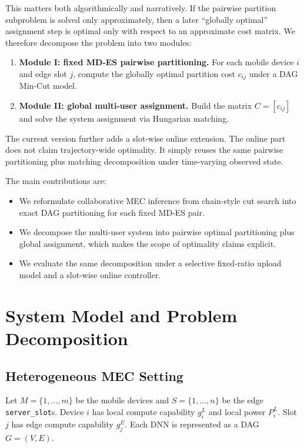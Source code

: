 \documentclass[conference]{IEEEtran}
\begin{document}
This matters both algorithmically and narratively. If the pairwise partition
subproblem is solved only approximately, then a later ``globally optimal''
assignment step is optimal only with respect to an approximate cost matrix. We
therefore decompose the problem into two modules:
\begin{enumerate}
\item \textbf{Module I: fixed MD-ES pairwise partitioning.} For each mobile
device $i$ and edge slot $j$, compute the globally optimal partition cost
$c_{ij}$ under a DAG Min-Cut model.
\item \textbf{Module II: global multi-user assignment.} Build the matrix
$C=[c_{ij}]$ and solve the system assignment via Hungarian matching.
\end{enumerate}

The current version further adds a slot-wise online extension. The online part
does not claim trajectory-wide optimality. It simply reuses the same pairwise
partitioning plus matching decomposition under time-varying observed state.

The main contributions are:
\begin{itemize}
\item We reformulate collaborative MEC inference from chain-style cut search
into exact DAG partitioning for each fixed MD-ES pair.
\item We decompose the multi-user system into pairwise optimal partitioning
plus global assignment, which makes the scope of optimality claims explicit.
\item We evaluate the same decomposition under a selective fixed-ratio upload
model and a slot-wise online controller.
\end{itemize}

\section{System Model and Problem Decomposition}

\subsection{Heterogeneous MEC Setting}

Let $M=\{1,\dots,m\}$ be the mobile devices and $S=\{1,\dots,n\}$ be the edge
\texttt{server\_slot}s. Device $i$ has local compute capability $g_i^L$ and
local power $P_i^L$. Slot $j$ has edge compute capability $g_j^E$. Each DNN is
represented as a DAG $G=(V,E)$.
\end{document}
